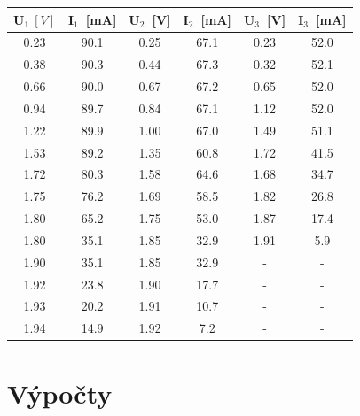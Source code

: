 \documentclass[10pt]{article}
\begin{document}
\begin{scriptsize}
\begin{minipage}[t]{.5\textwidth}
\begin{tabular}[b]{|c|c|c|c|c|c|}
\hline
U$_1~[V]$ & I$_1$~[mA] & U$_2$~[V] & I$_2$~[mA] & U$_3$~[V] & I$_3$~[mA] \\
\hline
0.23 & 90.1 & 0.25 & 67.1 & 0.23 & 52.0 \\
0.38 & 90.3 & 0.44 & 67.3 & 0.32 & 52.1 \\
0.66 & 90.0 & 0.67 & 67.2 & 0.65 & 52.0 \\
0.94 & 89.7 & 0.84 & 67.1 & 1.12 & 52.0 \\
1.22 & 89.9 & 1.00 & 67.0 & 1.49 & 51.1 \\
1.53 & 89.2 & 1.35 & 60.8 & 1.72 & 41.5 \\
1.72 & 80.3 & 1.58 & 64.6 & 1.68 & 34.7 \\
1.75 & 76.2 & 1.69 & 58.5 & 1.82 & 26.8 \\
1.80 & 65.2 & 1.75 & 53.0 & 1.87 & 17.4 \\
1.80 & 35.1 & 1.85 & 32.9 & 1.91 & 5.9 \\
1.90 & 35.1 & 1.85 & 32.9 & - & - \\
1.92 & 23.8 & 1.90 & 17.7 & - & - \\
1.93 & 20.2 & 1.91 & 10.7 & - & - \\
1.94 & 14.9 & 1.92 & 7.2 & - & - \\
\hline
\end{tabular}
\end{minipage}
\end{scriptsize}

\section{Výpočty}
\end{document}

